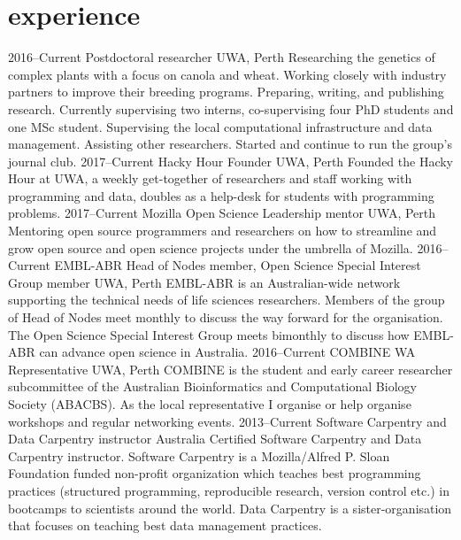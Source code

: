 \documentclass[]{friggeri-cv} %
\begin{document}
\section{experience}

\begin{entrylist}
\entry
{2016--Current}
{Postdoctoral researcher}
{UWA, Perth}
{Researching the genetics of complex plants with a focus on canola and wheat. Working closely with industry partners to improve their breeding programs. Preparing, writing, and publishing research. Currently supervising two interns, co-supervising four PhD students and one MSc student. Supervising the local computational infrastructure and data management. Assisting other researchers. Started and continue to run the group's journal club.}
\entry
{2017--Current}
{Hacky Hour Founder}
{UWA, Perth}
{Founded the Hacky Hour at UWA, a weekly get-together of researchers and staff working with programming and data, doubles as a help-desk for students with programming problems.}
\entry
{2017--Current}
{Mozilla Open Science Leadership mentor}
{UWA, Perth}
{Mentoring open source programmers and researchers on how to streamline and grow open source and open science projects under the umbrella of Mozilla.}
\entry
{2016--Current}
{EMBL-ABR Head of Nodes member, Open Science Special Interest Group member}
{UWA, Perth}
{EMBL-ABR is an Australian-wide network supporting the technical needs of life sciences researchers. Members of the group of Head of Nodes meet monthly to discuss the way forward for the organisation. The Open Science Special Interest Group meets bimonthly to discuss how EMBL-ABR can advance open science in Australia.}
\entry
{2016--Current}
{COMBINE WA Representative}
{UWA, Perth}
{COMBINE is the student and early career researcher subcommittee of the Australian Bioinformatics and Computational Biology Society (ABACBS). As the local representative I organise or help organise workshops and regular networking events.}
\entry
{2013--Current}
{Software Carpentry and Data Carpentry instructor}
{Australia}
{Certified Software Carpentry and Data Carpentry instructor. Software Carpentry is a Mozilla/Alfred P. Sloan Foundation funded non-profit organization which teaches best programming practices (structured programming, reproducible research, version control etc.) in bootcamps to scientists around the world. Data Carpentry is a sister-organisation that focuses on teaching best data management practices.}

\end{entrylist}
\end{document}
